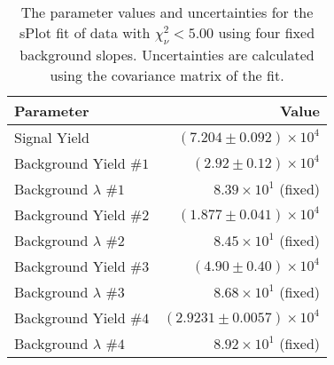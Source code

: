 
\begin{table}[ht]
    \begin{center}
        \begin{tabular}{lr}\toprule
            Parameter & Value \\\midrule
            Signal Yield & $(7.204 \pm 0.092) \times 10^{4}$ \\
            Background Yield $\#1$ & $(2.92 \pm 0.12) \times 10^{4}$ \\
            Background $\lambda$ $\#1$ & $8.39 \times 10^{1}$ (fixed) \\
            Background Yield $\#2$ & $(1.877 \pm 0.041) \times 10^{4}$ \\
            Background $\lambda$ $\#2$ & $8.45 \times 10^{1}$ (fixed) \\
            Background Yield $\#3$ & $(4.90 \pm 0.40) \times 10^{4}$ \\
            Background $\lambda$ $\#3$ & $8.68 \times 10^{1}$ (fixed) \\
            Background Yield $\#4$ & $(2.9231 \pm 0.0057) \times 10^{4}$ \\
            Background $\lambda$ $\#4$ & $8.92 \times 10^{1}$ (fixed) \\\bottomrule
        \end{tabular}
        \caption{The parameter values and uncertainties for the sPlot fit of data with $\chi^2_\nu < 5.00$ using four fixed background slopes. Uncertainties are calculated using the covariance matrix of the fit.}\label{tab:splot-fit-results-chisqdof-5.00-fixed-4}
    \end{center}
\end{table}
